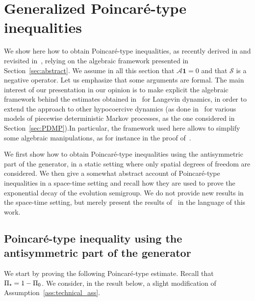 \documentclass[10pt]{amsart}
\theoremstyle{definition}\newtheorem{defi}[theo]{Definition}\newtheorem{rema}[theo]{Remark}\newtheorem{exam}[theo]{Example}\newtheorem{exem}[theo]{Example}\newtheorem{nota}[theo]{Notation}
\newcommand{\cLs}{\mathcal{S}}
\newcommand{\cLa}{\mathcal{A}}
\newcommand{\bfun}{\mathbf{1}}
\newcommand{\subplus}{\textnormal{\texttt{+}}}
\begin{document}
\appendix
\section{Generalized Poincaré-type inequalities}\label{sec:gen_Poincare}

We show here how to obtain Poincaré-type inequalities, as recently derived in \cite{AM19} and revisited in~\cite{CLW19}, relying on the algebraic framework presented in Section~\ref{sec:abstract}. We assume in all this section that $\cLa \bfun = 0$ and that $\cLs$ is a negative operator. Let us emphasize that some arguments are formal. The main interest of our presentation in our opinion is to make explicit the algebraic framework behind the estimates obtained in~\cite{AM19,CLW19} for Langevin dynamics, in order to extend the approach to other hypocoercive dynamics (as done in~\cite{LW20} for various models of piecewise deterministic Markov processes, as the one considered in Section~\ref{sec:PDMP}).\linebreak In particular, the framework used here allows to simplify some algebraic manipulations, as for instance in the proof of~\cite[Theorem~2]{CLW19}.

We first show how to obtain Poincaré-type inequalities using the antisymmetric part of the generator, in a static setting where only spatial degrees of freedom are considered. We then give a somewhat abstract account of Poincaré-type inequalities in a space-time setting and recall how they are used to prove the exponential decay of the evolution semigroup. We do not provide new results in the space-time setting, but merely present the results of~\cite{AM19,CLW19} in the language of this work.

\subsection{Poincaré-type inequality using the antisymmetric part of the generator}
We start by proving the following Poincaré-type estimate. Recall that $\Pi_\subplus = 1-\Pi_0$. We consider, in the result below, a slight modification of Assumption~\ref{ass:technical_ass}.
\end{document}
